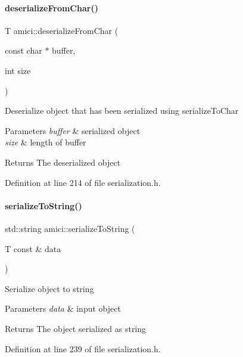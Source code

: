 \paragraph{\texorpdfstring{deserializeFromChar()}{deserializeFromChar()}}
{\footnotesize\ttfamily T amici\+::deserialize\+From\+Char (\begin{DoxyParamCaption}\item[{const char $\ast$}]{buffer,  }\item[{int}]{size }\end{DoxyParamCaption})}

Deserialize object that has been serialized using serialize\+To\+Char


\begin{DoxyParams}{Parameters}
{\em buffer} & serialized object \\
\hline
{\em size} & length of buffer\\
\hline
\end{DoxyParams}
\begin{DoxyReturn}{Returns}
The deserialized object
\end{DoxyReturn}


Definition at line 214 of file serialization.\+h.

\mbox{\label{namespaceamici_aed4ae7f193798ade342a0f70491e849e}} 
\paragraph{\texorpdfstring{serializeToString()}{serializeToString()}}
{\footnotesize\ttfamily std\+::string amici\+::serialize\+To\+String (\begin{DoxyParamCaption}\item[{T const \&}]{data }\end{DoxyParamCaption})}

Serialize object to string


\begin{DoxyParams}{Parameters}
{\em data} & input object\\
\hline
\end{DoxyParams}
\begin{DoxyReturn}{Returns}
The object serialized as string
\end{DoxyReturn}


Definition at line 239 of file serialization.\+h.

